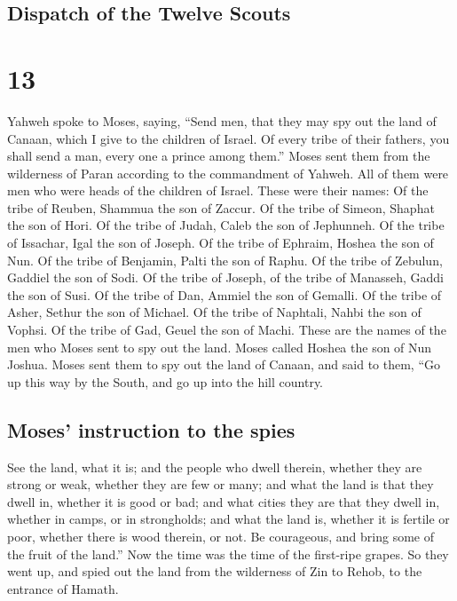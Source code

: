 \hypertarget{dispatch-of-the-twelve-scouts}{%
\subsection{Dispatch of the Twelve
Scouts}\label{dispatch-of-the-twelve-scouts}}

\hypertarget{section-12}{%
\section{13}\label{section-12}}

 Yahweh spoke to Moses, saying,  ``Send men,
that they may spy out the land of Canaan, which I give to the children
of Israel. Of every tribe of their fathers, you shall send a man, every
one a prince among them.''  Moses sent them from the
wilderness of Paran according to the commandment of Yahweh. All of them
were men who were heads of the children of Israel.  These
were their names: Of the tribe of Reuben, Shammua the son of Zaccur.
 Of the tribe of Simeon, Shaphat the son of Hori.
 Of the tribe of Judah, Caleb the son of Jephunneh.
 Of the tribe of Issachar, Igal the son of Joseph.
 Of the tribe of Ephraim, Hoshea the son of Nun.
 Of the tribe of Benjamin, Palti the son of Raphu.
 Of the tribe of Zebulun, Gaddiel the son of Sodi.
 Of the tribe of Joseph, of the tribe of Manasseh, Gaddi
the son of Susi.  Of the tribe of Dan, Ammiel the son of
Gemalli.  Of the tribe of Asher, Sethur the son of
Michael.  Of the tribe of Naphtali, Nahbi the son of
Vophsi.  Of the tribe of Gad, Geuel the son of Machi.
 These are the names of the men who Moses sent to spy out
the land. Moses called Hoshea the son of Nun Joshua. 
Moses sent them to spy out the land of Canaan, and said to them, ``Go up
this way by the South, and go up into the hill country.

\hypertarget{moses-instruction-to-the-spies}{%
\subsection{Moses' instruction to the
spies}\label{moses-instruction-to-the-spies}}

 See the land, what it is; and the people who dwell
therein, whether they are strong or weak, whether they are few or many;
 and what the land is that they dwell in, whether it is
good or bad; and what cities they are that they dwell in, whether in
camps, or in strongholds;  and what the land is, whether
it is fertile or poor, whether there is wood therein, or not. Be
courageous, and bring some of the fruit of the land.'' Now the time was
the time of the first-ripe grapes.  So they went up, and
spied out the land from the wilderness of Zin to Rehob, to the entrance
of Hamath.

